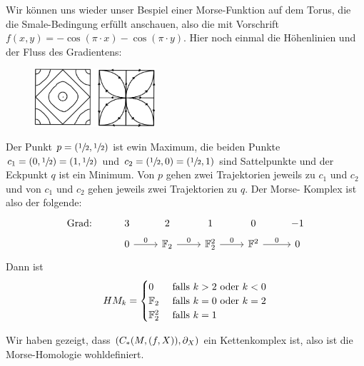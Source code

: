 \begin{example}
    Wir können uns wieder unser Bespiel einer Morse-Funktion auf dem Torus, die die Smale-Bedingung 
    erfüllt anschauen, also die mit Vorschrift $f(x, y) = -\cos (\pi \cdot x) - \cos(\pi \cdot y)$.
    Hier noch einmal die Höhenlinien und der Fluss des Gradientens:
    \begin{figure}[H]
        \centering
        \includegraphics[width=0.4\textwidth]{../resources/morse-funktion-torus.jpeg}
    \end{figure}
    Der Punkt $p = (\sfrac{1}{2}, \sfrac{1}{2})$ ist ewin Maximum, die beiden Punkte 
        $c_1 = (0, \sfrac{1}{2}) = (1, \sfrac{1}{2})$ und $c_2 = (\sfrac{1}{2}, 0) = (\sfrac{1}{2}, 1)$
        sind Sattelpunkte und der Eckpunkt $q$ ist ein Minimum. Von $p$ gehen zwei Trajektorien jeweils
        zu $c_1$ und $c_2$ und von $c_1$ und $c_2$ gehen jeweils zwei Trajektorien zu $q$. Der Morse-
        Komplex ist also der folgende:
        \[ \begin{tikzcd}[row sep=tiny]
            \text{Grad:} & 3 & 2 & 1 & 0 & -1 \\
            & 0 \arrow[r, "0"] & \F_2 \arrow[r, "0"] & \F_2^2 \arrow[r, "0"] & \F^2 \arrow[r, "0"] & 0
        \end{tikzcd} \]
        Dann ist 
        \[ HM_k = \begin{cases}
            0 & \text{ falls } k > 2 \text{ oder } k < 0 \\
            { \mathbb F }_2 & \text{ falls } k = 0 \text{ oder } k = 2 \\
            { \mathbb F }_2^2 & \text{ falls } k = 1
        \end{cases} \]
\end{example}

Wir haben gezeigt, dass $(C_{\ast}(M, (f, X)), { \partial }_X)$ ein Kettenkomplex ist, also ist die 
Morse-Homologie wohldefiniert.



